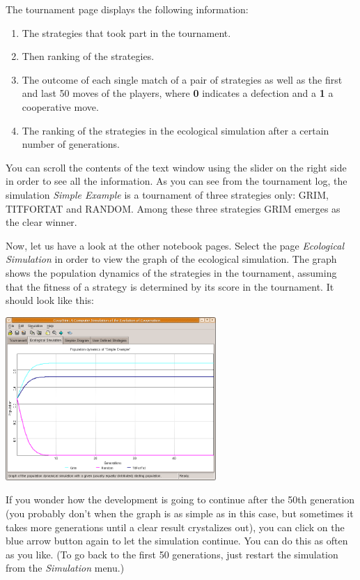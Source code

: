 \documentclass[12pt,a4paper,USenglish]{article}
\begin{document}
The tournament page displays the following information:

\begin{enumerate}
\item The strategies that took part in the tournament.
\item Then ranking of the strategies.
\item The outcome of each single match of a pair of strategies as well as
the first and last 50 moves of the players, where {\bf 0} indicates a defection
and a {\bf 1} a cooperative move.
\item The ranking of the strategies in the ecological simulation after a
certain number of generations.
\end{enumerate}

You can scroll the contents of the text window using the slider on the
right side in order to see all the information. As you can see from the
tournament log, the simulation \emph{Simple Example} is a tournament
of three strategies only: GRIM, TITFORTAT and RANDOM. Among these
three strategies GRIM emerges as the clear winner.

Now, let us have a look at the other notebook pages. Select the page
\emph{Ecological Simulation} in order to view the graph of the ecological
simulation. The graph shows the population dynamics of the strategies
in the tournament, assuming that the fitness of a strategy is
determined by its score in the tournament. It should look like this:

\begin{center}
\includegraphics[width=8cm,keepaspectratio]{big_images/eco_page.png}
\end{center}

If you wonder how the development is going to continue after the 50th
generation (you probably don't when the graph is as simple as in this case, but
sometimes it takes more generations until a clear result crystalizes out), you
can click on the blue arrow button again to let the simulation continue. You
can do this as often as you like. (To go back to the first 50 generations,
just restart the simulation from the {\em Simulation} menu.)
\end{document}
